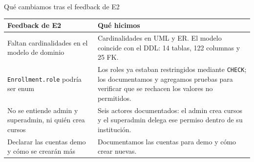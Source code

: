 
\begin{frame}{Qué cambiamos tras el feedback de E2}
\scriptsize
\renewcommand{\arraystretch}{1.2}
\begin{tabularx}{\textwidth}{>{\raggedright\arraybackslash}p{4.2cm}Y}
\toprule
\textbf{Feedback de E2} & \textbf{Qué hicimos} \\
\midrule
Faltan cardinalidades en el modelo de dominio & Cardinalidades en UML y ER. El modelo coincide con el DDL: 14 tablas, 122 columnas y 25 FK. \\
\texttt{Enrollment.role} podría ser enum & Los roles ya estaban restringidos mediante \texttt{CHECK}; los documentamos y agregamos pruebas para verificar que se rechacen los valores no permitidos. \\
No se entiende admin y superadmin, ni quién crea cursos & Seis actores documentados: el admin crea cursos y el superadmin delega ese permiso dentro de su institución. \\
Declarar las cuentas demo y cómo se crearán más & Documentamos las cuentas para demo y cómo crear nuevas. \\
\bottomrule
\end{tabularx}
\vspace{0.25cm}

\centering
{}
\end{frame}
